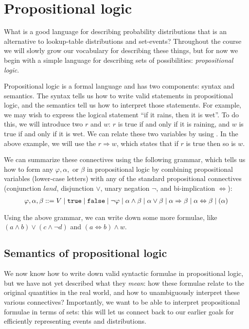 \documentclass{tufte-handout}
\begin{document}
\section{Propositional logic}

What is a good language for describing probability distributions that is an 
alternative to lookup-table distributions and set-events? Throughout the course 
we will slowly grow our vocabulary for describing these things, but for now we 
begin with a simple language for describing sets of possibilities: \emph{propositional logic}.

Propositional logic is a formal language and has two components: syntax and
semantics. The syntax tells us how to write valid statements in propositional
logic, and the semantics tell us how to interpret those statements. For example, we 
may wish to express the logical statement ``if it rains, then it is wet''. To do 
this, we will introduce two  $r$ and $w$: $r$ is true 
if and only if it is raining, and $w$ is true if and only if it is wet. We can 
relate these two variables by using . In the above example, 
we will use the  $r \Rightarrow w$, which states that if $r$ is 
true then so is $w$. 

We can summarize these connectives using the following grammar, which tells us how to form 
any  $\varphi, \alpha,$ or $\beta$ in propositional
logic by combining propositional variables
(lower-case letters) with any of the standard propositional connectives (conjunction $land$, disjunction $\lor$, 
unary negation $\neg$, and bi-implication $\Leftrightarrow$):
\begin{align}
    \varphi, \alpha, \beta ::= V \mid \texttt{true} \mid \texttt{false} \mid \neg \varphi \mid \alpha \land \beta \mid 
    \alpha \lor \beta \mid \alpha \Rightarrow \beta \mid \alpha \Leftrightarrow \beta 
    \mid (\alpha)
\end{align}

Using the above grammar, we can write down some more formulae, like
$(a \land b) \lor (c \land \neg d)$ and $(a \Leftrightarrow b) \land w$.

\subsection{Semantics of propositional logic}
We now know how to write down valid syntactic formulae in propositional logic, but 
we have not yet described what they \emph{mean}: how these formulae relate to the 
original quantities in the real world, and how to unambiguously interpret these various
connectives? Importantly, we want to be able to interpret propositional formulae 
in terms of sets: this will let us connect back to our earlier goals for 
efficiently representing events and distributions.
\end{document}
